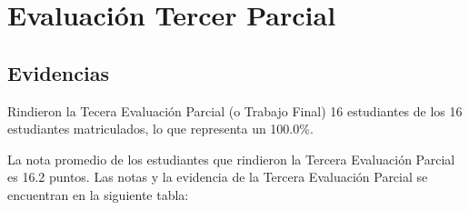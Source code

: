 \chapter{Evaluación Tercer Parcial}
\newpage




\pagestyle{empty} %

\section{Evidencias}
Rindieron la Tecera Evaluación Parcial (o Trabajo Final) 16 estudiantes de los 16 estudiantes matriculados, lo que representa un 100.0\%.

La nota promedio de los estudiantes que rindieron la Tercera Evaluación Parcial es 16.2 puntos. Las notas y la evidencia de la Tercera Evaluación Parcial se encuentran en la siguiente tabla:

